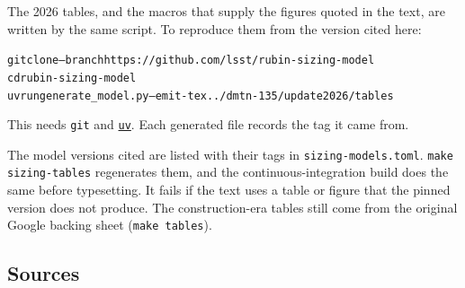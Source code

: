 The 2026 tables, and the macros that supply the figures quoted in
the text, are written by the same script. To reproduce them from the version
cited here:
\begin{center}
\begin{minipage}{0.92\textwidth}
\small
\begin{alltt}
git clone --branch \smSourceRef{} https://github.com/lsst/rubin-sizing-model
cd rubin-sizing-model
uv run generate_model.py --emit-tex ../dmtn-135/update2026/tables
\end{alltt}
\end{minipage}
\end{center}
This needs \texttt{git} and \href{https://docs.astral.sh/uv/}{\texttt{uv}}.
Each generated file records the tag it came from.

The model versions cited are listed with their tags in
\texttt{sizing-models.toml}. \texttt{make sizing-tables} regenerates them, and
the continuous-integration build does the same before typesetting. It fails if
the text uses a table or figure that the pinned version does not produce.
The construction-era tables still come from the original Google backing
sheet (\texttt{make tables}).

\subsection{Sources}

